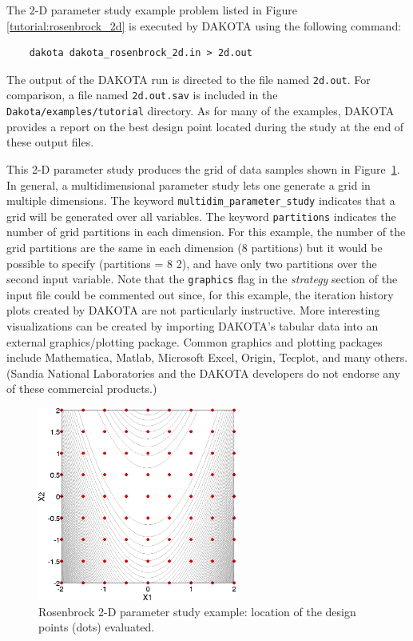 The 2-D parameter study example problem listed in Figure~
\ref{tutorial:rosenbrock_2d} is executed by DAKOTA using the
following command:
\begin{small}
\begin{verbatim}
    dakota dakota_rosenbrock_2d.in > 2d.out
\end{verbatim}
\end{small}

The output of the DAKOTA run is directed to the file named
\texttt{2d.out}. For comparison, a file named \texttt{2d.out.sav} is
included in the \texttt{Dakota/examples/tutorial} directory. As
for many of the examples, DAKOTA provides a report on the best design
point located during the study at the end of these output files.

This 2-D parameter study produces the grid of data samples shown in
Figure~\ref{tutorial:rosenbrock_2d_graphics}. In general, a multidimensional 
parameter study lets one generate a grid in multiple dimensions. 
The keyword \texttt{multidim\_parameter\_study} indicates that 
a grid will be generated over all variables.  The keyword 
\texttt{partitions} indicates the number of grid partitions in 
each dimension. For this example, the number of the grid partitions 
are the same in each dimension (8 partitions) but it would be possible 
to specify (partitions = 8 2), and have only two partitions 
over the second input variable.   Note that the
\texttt{graphics} flag in the \emph{strategy} section of the input
file could be commented out since, for this example, the iteration
history plots created by DAKOTA are not particularly instructive. More
interesting visualizations can be created by importing DAKOTA's
tabular data into an external graphics/plotting package. Common
graphics and plotting packages include Mathematica, Matlab, Microsoft
Excel, Origin, Tecplot, and many others. (Sandia National Laboratories
and the DAKOTA developers do not endorse any of these commercial
products.)

\begin{figure}[htb!]
  \centering
  \includegraphics[height=2.5in]{images/rosen_2d_pts}
  \caption{Rosenbrock 2-D parameter study example:
  location of the design points (dots) evaluated.}
  \label{tutorial:rosenbrock_2d_graphics}
\end{figure}

